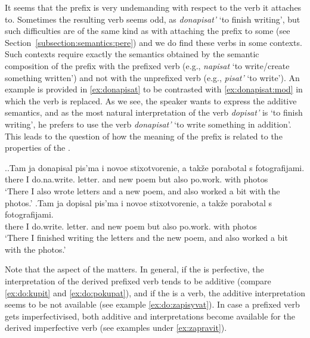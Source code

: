 It seems that the prefix  is very undemanding with respect to the verb it attaches to. Sometimes the resulting verb seems odd, as \textit{donapisat'} `to finish writing', but such difficulties are of the same kind as with attaching the  prefix  to some  (see Section~\ref{subsection:semantics:pere}) and we do find these verbs in some contexts. Such contexts require exactly the semantics obtained by the semantic composition of the prefix  with the prefixed verb (e.g., \textit{napisat} `to write/create something written') and not with the unprefixed verb (e.g., \textit{pisat'} `to write'). An example is provided in \ref{ex:donapisat} to be contrasted with \ref{ex:donapisat:mod} in which the verb is replaced. As we see, the speaker wants to express the additive semantics, and as the most natural interpretation of the verb \textit{dopisat'} is `to finish writing', he prefers to use the verb \textit{donapisat'} `to write something in addition'. This leads to the question of how the meaning of the prefix is related to the properties of the .

\ex.\ag.\label{ex:donapisat}Tam ja donapisal pis'ma i novoe stixotvorenie, a tak\v{z}e porabotal s fotografijami.\\
there I do.na.write. letter. and new poem but also po.work. with photos\\
\trans `There I also wrote letters and a new poem, and also worked a bit with the photos.'
\bg.\label{ex:donapisat:mod}Tam ja dopisal pis'ma i novoe stixotvorenie, a tak\v{z}e porabotal s fotografijami.\\
there I do.write. letter. and new poem but also po.work. with photos\\
\trans `There I finished writing the letters and the new poem, and also worked a bit with the photos.'

Note that the aspect of the  matters. In general, if the  is perfective, the interpretation of the derived prefixed verb tends to be additive (compare \ref{ex:do:kupit} and \ref{ex:do:pokupat}), and if the  is a  verb, the additive interpretation seems to be not available (see example \ref{ex:do:zapisyvat}). In case a prefixed verb gets imperfectivised, both additive and  interpretations become available for the derived imperfective verb (see examples under \ref{ex:zapravit}).

